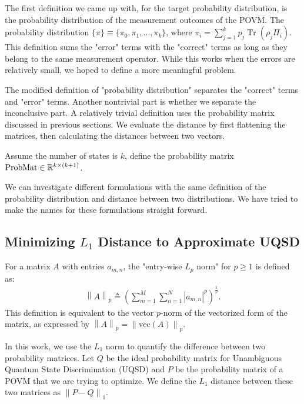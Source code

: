 The first definition we came up with, for the target probability distribution,
is the probability distribution of the measurement outcomes of the POVM.
The probability distribution $\{\pi\} \equiv \{\pi_{0}, \pi_{1}, \dots, \pi_{k}\}$,
where $\pi_{i} = \sum_{j=1}^{k} p_{j} \operatorname{Tr}(\rho_{j} \Pi_{i})$.
This definition sums the "error" terms with the "correct" terms as long as
they belong to the same measurement operator. While this works when the errors
are relatively small, we hoped to define a more meaningful problem.

The modified definition of "probability distribution" separates the "correct"
terms and "error" terms.
Another nontrivial part is whether we separate the inconclusive part.
A relatively trivial definition uses the probability matrix discussed in
previous sections. We evaluate the distance by first flattening the matrices,
then calculating the distances between two vectors.

Assume the number of states is $k$, define the probability matrix $\textnormal{ProbMat}
    \in \mathbb{R}^{k \times (k+1)}$.

We can investigate different formulations with the same definition of the
probability distribution and distance between two distributions.
We have tried to make the names for these formulations straight forward.



\subsection{Minimizing \texorpdfstring{$L_1$}{L1} Distance to Approximate UQSD}
For a matrix $A$ with entries $a_{m,n}$, the "entry-wise $L_p$ norm" for
$p \geq 1$ is defined as:
\begin{align}
    \left\| A \right\|_{p} \triangleq \left( \sum_{m=1}^{M} \sum_{n=1}^{N} |a_{m, n}| ^{p} \right) ^ {\frac{1}{p}}.
\end{align}
This definition is equivalent to the vector $p$-norm of the vectorized form of
the matrix, as expressed by $\left\| A \right\|_{p} = \left\| \text{vec}(A) \right\|_{p}$.

In this work, we use the $L_1$ norm to quantify the difference between two
probability matrices.
Let $Q$ be the ideal probability matrix for Unambiguous Quantum State
Discrimination (UQSD) and $P$ be the probability matrix of a POVM that we are trying to optimize.
We define the $L_1$ distance between these two matrices as $\left\| P-Q \right\|_{1}$.

